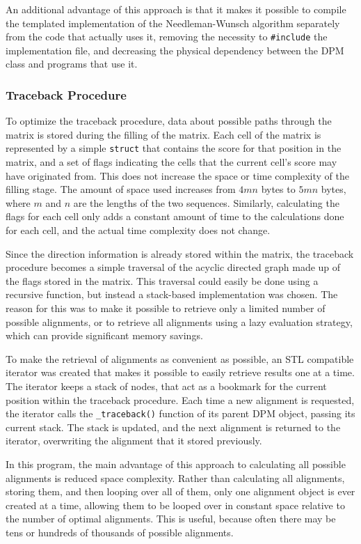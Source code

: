 \documentclass[a4paper]{report}
\begin{document}
An additional advantage of this approach is that it makes it possible to compile
the templated implementation of the Needleman-Wunsch algorithm separately from the
code that actually uses it, removing the necessity to \verb=#include= the
implementation file, and decreasing the physical dependency between the DPM class and
programs that use it.

\subsubsection*{Traceback Procedure}

To optimize the traceback procedure, data about possible paths through
the matrix is stored during the filling of the matrix. Each cell of the matrix
is represented by a simple \verb=struct= that contains the score for that position
in the matrix, and a set of flags indicating the cells that the current cell's
score may have originated from. This does not increase the space or time
complexity of the filling stage. The amount of space used increases from
$4mn$ bytes to $5mn$ bytes, where $m$ and $n$ are the lengths of the
two sequences. Similarly, calculating the flags for each cell only adds a
constant amount of time to the calculations done for each cell, and the actual
time complexity does not change.

Since the direction information is already stored within the matrix, the
traceback procedure becomes a simple traversal of the acyclic directed
graph made up of the flags stored in the matrix. This traversal could easily
be done using a recursive function, but instead a stack-based implementation
was chosen. The reason for this was to make it possible to retrieve only a
limited number of possible alignments, or to retrieve all alignments using
a lazy evaluation strategy, which can provide significant memory savings.

To make the retrieval of alignments as convenient as possible, an STL compatible
iterator was created that makes it possible to easily retrieve results one at a
time. The iterator keeps a stack of nodes, that act as a bookmark for the current
position within the traceback procedure. Each time a new alignment is requested,
the iterator calls the \verb=_traceback()= function of its parent DPM object, passing its
current stack. The stack is updated, and the next alignment is returned to the
iterator, overwriting the alignment that it stored previously.

In this program, the main advantage of this approach to calculating all
possible alignments is reduced space complexity. Rather than calculating all
alignments, storing them, and then looping over all of them, only one alignment
object is ever created at a time, allowing them to be looped over in constant
space relative to the number of optimal alignments. This is useful, because often
there may be tens or hundreds of thousands of possible alignments.
\end{document}
